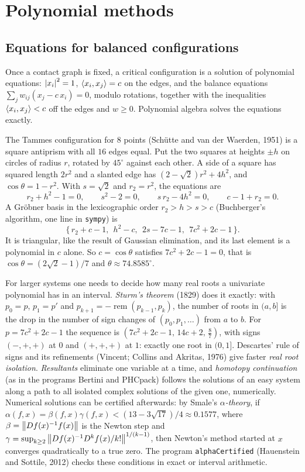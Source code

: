 \section{Polynomial methods}
\label{COMP:sec:poly}

\subsection{Equations for balanced configurations}
Once a contact graph is fixed, a critical configuration is a solution of polynomial equations:
$\left\lvert x_i \right\rvert^2=1$, $\langle x_i, x_j\rangle=c$ on the edges, and the balance equations
$\sum_jw_{ij}(x_j-c\,x_i)=0$, modulo rotations, together with the inequalities $\langle x_i, x_j\rangle<c$ off the
edges and $w\ge0$. Polynomial algebra solves the equations exactly.

\begin{example}[The square antiprism, $N=8$]
The Tammes configuration for $8$ points (Sch\"utte and van der Waerden, 1951) is a square antiprism with
all $16$ edges equal. Put the two squares at heights $\pm h$ on circles of radius $r$, rotated by
$45^\circ$ against each other. A side of a square has squared length $2r^2$ and a slanted edge has
$(2-\sqrt2)r^2+4h^2$, and $\cos\theta=1-r^2$. With $s=\sqrt2$ and $r_2=r^2$, the equations are
\[
  r_2+h^2-1=0,\qquad s^2-2=0,\qquad s\,r_2-4h^2=0,\qquad c-1+r_2=0 .
\]
A Gr\"obner basis in the lexicographic order $r_2>h>s>c$ (Buchberger's algorithm, one line in
\texttt{sympy}) is
\[
  \{\,r_2+c-1,\ \ h^2-c,\ \ 2s-7c-1,\ \ 7c^2+2c-1\,\}.
\]
It is triangular, like the result of Gaussian elimination, and its last element is a polynomial in $c$
alone. So $c=\cos\theta$ satisfies $7c^2+2c-1=0$, that is $\cos\theta=(2\sqrt2-1)/7$ and
$\theta\approx74.8585^\circ$.
\end{example}

For larger systems one needs to decide how many real roots a univariate polynomial has in an
interval. \emph{Sturm's theorem} (1829) does it exactly: with $p_0=p$, $p_1=p'$ and
$p_{k+1}=-\operatorname{rem}(p_{k-1},p_k)$, the number of roots in $(a,b]$ is the drop in the number of sign
changes of $(p_0,p_1,\dots)$ from $a$ to $b$. For $p=7c^2+2c-1$ the sequence is $(7c^2+2c-1,\,14c+2,\,\frac87)$,
with signs $(-,+,+)$ at $0$ and $(+,+,+)$ at $1$: exactly one root in $(0,1]$. Descartes' rule of signs
and its refinements (Vincent; Collins and Akritas, 1976) give faster \emph{real root isolation}.
\emph{Resultants} eliminate one variable at a time, and \emph{homotopy continuation} (as in the programs
Bertini and PHCpack) follows the solutions of an easy system along a path to all isolated complex solutions
of the given one, numerically. Numerical solutions can be certified afterwards: by Smale's
\emph{$\alpha$-theory}, if $\alpha(f,x)=\beta(f,x)\gamma(f,x)<(13-3\sqrt{17})/4\approx0.1577$, where
$\beta=\left\lVert Df(x)^{-1}f(x) \right\rVert$ is the Newton step and
$\gamma=\sup_{k\ge2}\left\lVert Df(x)^{-1}D^kf(x)/k! \right\rVert^{1/(k-1)}$, then Newton's method started at $x$ converges
quadratically to a true zero. The program \texttt{alphaCertified} (Hauenstein and Sottile, 2012) checks
these conditions in exact or interval arithmetic.

